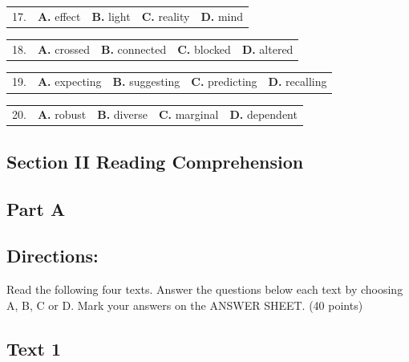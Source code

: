 \documentclass[UTF8,11pt]{ctexart}
\begin{document}
\noindent\begin{tabularx}{\linewidth}{@{}lXXXX@{}}17. & \textbf{A.} effect & \textbf{B.} light & \textbf{C.} reality & \textbf{D.} mind\\\end{tabularx}\par

\noindent\begin{tabularx}{\linewidth}{@{}lXXXX@{}}18. & \textbf{A.} crossed & \textbf{B.} connected & \textbf{C.} blocked & \textbf{D.} altered\\\end{tabularx}\par

\noindent\begin{tabularx}{\linewidth}{@{}lXXXX@{}}19. & \textbf{A.} expecting & \textbf{B.} suggesting & \textbf{C.} predicting & \textbf{D.} recalling\\\end{tabularx}\par

\noindent\begin{tabularx}{\linewidth}{@{}lXXXX@{}}20. & \textbf{A.} robust & \textbf{B.} diverse & \textbf{C.} marginal & \textbf{D.} dependent\\\end{tabularx}\par

\subsection*{\textbf{Section II Reading Comprehension}}


\subsection*{\textbf{Part A}}


\subsection*{\textbf{Directions:}}


Read the following four texts. Answer the questions below each text by choosing A, B, C or D. Mark your answers on the ANSWER SHEET. (40 points)


\subsection*{\textbf{Text 1}}
\end{document}
